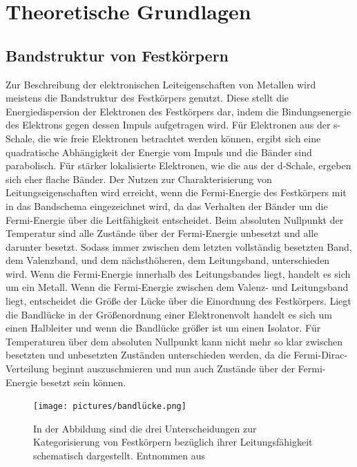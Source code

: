 \section{Theoretische Grundlagen}
    \subsection{Bandstruktur von Festkörpern}
        Zur Beschreibung der elektronischen Leiteigenschaften von Metallen wird meistens die Bandstruktur des Festkörpers genutzt. Diese stellt die Energiedispersion der Elektronen des Festkörpers dar, indem 
        die Bindungsenergie des Elektrons gegen dessen Impuls aufgetragen wird. Für Elektronen aus der s-Schale, die wie freie Elektronen betrachtet werden können, ergibt sich eine quadratische Abhängigkeit 
        der Energie vom Impuls und die Bänder sind parabolisch. Für stärker lokalisierte Elektronen, wie die aus der d-Schale, ergeben sich eher flache Bänder. Der Nutzen zur Charakterisierung von 
        Leitungseigenschaften wird erreicht, wenn die Fermi-Energie des Festkörpers mit in das Bandschema eingezeichnet wird, da das Verhalten der Bänder um die Fermi-Energie über die Leitfähigkeit
        entscheidet. Beim absoluten Nullpunkt der Temperatur sind alle Zustände über der Fermi-Energie unbesetzt und alle darunter besetzt. Sodass immer zwischen dem letzten vollständig besetzten Band, dem 
        Valenzband, und dem nächsthöheren, dem Leitungsband, unterschieden wird. Wenn die Fermi-Energie innerhalb des Leitungsbandes liegt, handelt es sich um ein Metall. Wenn die Fermi-Energie zwischen dem 
        Valenz- und Leitungsband liegt, entscheidet die Größe der Lücke über die Einordnung des Festkörpers. Liegt die Bandlücke in der Größenordnung einer Elektronenvolt handelt es sich um einen Halbleiter
        und wenn die Bandlücke größer ist um einen Isolator. Für Temperaturen über dem absoluten Nullpunkt kann nicht mehr so klar zwischen besetzten und unbesetzten Zuständen unterschieden werden, da die 
        Fermi-Dirac-Verteilung beginnt auszuschmieren und nun auch Zustände über der Fermi-Energie besetzt sein können. 

        \FloatBarrier

        \begin{figure}[h]
          \centering
          \texttt{[image: pictures/bandlücke.png]}
          \caption{In der Abbildung sind die drei Unterscheidungen zur Kategorisierung von Festkörpern bezüglich ihrer Leitungsfähigkeit schematisch dargestellt. Entnommen aus \cite{demtroder_atome_2016}}
          \label{fig:Bandlücken}
        \end{figure}


